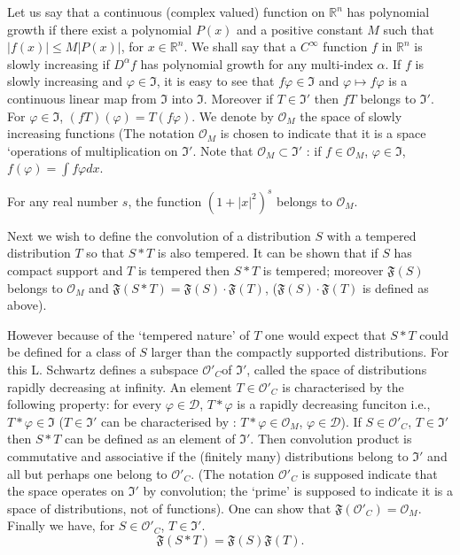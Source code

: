 Let us say that a continuous (complex valued) function on $\mathbb{R}^{n}$ has polynomial growth if there exist a polynomial $P(x)$ and a positive constant $M$ such that $|f(x)|\leq M|P(x)|$, for $x\in \mathbb{R}^{n}$. We shall say that a $C^{\infty}$ function $f$ in $\mathbb{R}^{n}$ is slowly increasing if $D^{\alpha}f$ has polynomial growth for any multi-index $\alpha$. If $f$ is slowly increasing and $\varphi\in \mathfrak{I}$, it is easy to see that $f\varphi \in \mathfrak{I}$ and $\varphi \mapsto f\varphi$ is a continuous linear map from $\mathfrak{I}$ into $\mathfrak{I}$. Moreover if $T\in \mathfrak{I}'$ then $fT$ belongs to $\mathfrak{I}'$. For $\varphi \in \mathfrak{I}$, $(fT)(\varphi)=T(f\varphi)$. We denote by $\mathcal{O}_{M}$ the space of slowly increasing functions (The notation $\mathcal{O}_{M}$ is chosen to indicate that it is a space `operations of multiplication on $\mathfrak{I}'$. Note that $\mathcal{O}_{M}\subset \mathfrak{I}'$ : if $f\in \mathcal{O}_{M}$, $\varphi \in \mathfrak{I}$, $f(\varphi)=\int f\varphi dx$.

\begin{example*}
For any real number $s$, the function $(1+|x|^{2})^{s}$ belongs to $\mathcal{O}_{M}$. 

Next we wish to define the convolution of a distribution $S$ with a tempered distribution $T$ so that $S\ast T$ is also tempered. It can be shown that if $S$ has compact support and $T$ is tempered then $S\ast T$ is tempered; moreover $\mathfrak{F}(S)$ belongs to $\mathcal{O}_{M}$ and $\mathfrak{F}(S\ast T)=\mathfrak{F}(S)\cdot \mathfrak{F}(T)$, ($\mathfrak{F}(S)\cdot \mathfrak{F}(T)$ is defined as above).
\end{example*}

However because of the `tempered nature' of $T$ one would expect that $S\ast T$ could be defined for a class of $S$ larger than the compactly supported distributions. For this L. Schwartz defines a subspace $\mathcal{O}'_{C}$\pageoriginale  of $\mathfrak{I}'$, called the space of distributions rapidly decreasing at infinity. An element $T\in \mathcal{O}'_{C}$ is characterised by the following property: for every $\varphi\in \mathcal{D}$, $T\ast \varphi$ is a rapidly decreasing funciton i.e., $T\ast \varphi\in \mathfrak{I}$ ($T\in \mathfrak{I}'$ can be characterised by : $T\ast \varphi\in \mathcal{O}_{M}$, $\varphi\in \mathcal{D}$). If $S\in \mathcal{O}'_{C}$, $T\in \mathfrak{I}'$ then $S\ast T$ can be defined as an element of $\mathfrak{I}'$. Then convolution product is commutative and associative if the (finitely many) distributions belong to $\mathfrak{I}'$ and all but perhaps one belong to $\mathcal{O}'_{C}$. (The notation $\mathcal{O}'_{C}$ is supposed indicate that the space operates on $\mathfrak{I}'$ by convolution; the `prime' is supposed to indicate it is a space of distributions, not of functions). One can show that $\mathfrak{F}(\mathcal{O}'_{C})=\mathcal{O}_{M}$. Finally we have, for $S\in \mathcal{O}'_{C}$, $T\in \mathfrak{I}'$.
$$
\mathfrak{F}(S\ast T)=\mathfrak{F}(S)\mathfrak{F}(T).
$$

